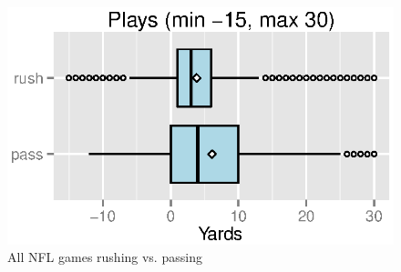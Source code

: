 \documentclass{exam}
\begin{document}
  \begin{figure}[H]
    \centering
    \includegraphics{figures/nfl/rushes_and_passes.eps}
    \caption{All NFL games rushing vs. passing}
  \end{figure}


\end{document}
